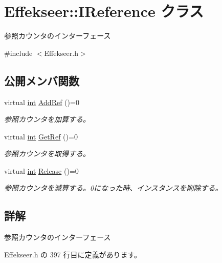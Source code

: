 \hypertarget{class_effekseer_1_1_i_reference}{}\section{Effekseer\+:\+:I\+Reference クラス}
\label{class_effekseer_1_1_i_reference}


参照カウンタのインターフェース  




{\ttfamily \#include $<$Effekseer.\+h$>$}

\subsection*{公開メンバ関数}
\begin{DoxyCompactItemize}
\item 
virtual \mbox{\hyperlink{namespace_effekseer_ace0abf7c2e6947e519ebe8b54cbcc30a}{int}} \mbox{\hyperlink{class_effekseer_1_1_i_reference_a3e3b54e8e5081e24f5784e4f9b8f6257}{Add\+Ref}} ()=0
\begin{DoxyCompactList}\small\item\em 参照カウンタを加算する。 \end{DoxyCompactList}\item 
virtual \mbox{\hyperlink{namespace_effekseer_ace0abf7c2e6947e519ebe8b54cbcc30a}{int}} \mbox{\hyperlink{class_effekseer_1_1_i_reference_a95274c788c8c03d27a3e424facc728b6}{Get\+Ref}} ()=0
\begin{DoxyCompactList}\small\item\em 参照カウンタを取得する。 \end{DoxyCompactList}\item 
virtual \mbox{\hyperlink{namespace_effekseer_ace0abf7c2e6947e519ebe8b54cbcc30a}{int}} \mbox{\hyperlink{class_effekseer_1_1_i_reference_ad8d601188c0f088f4748aa2da8758bb5}{Release}} ()=0
\begin{DoxyCompactList}\small\item\em 参照カウンタを減算する。0になった時、インスタンスを削除する。 \end{DoxyCompactList}\end{DoxyCompactItemize}


\subsection{詳解}
参照カウンタのインターフェース 

 Effekseer.\+h の 397 行目に定義があります。



